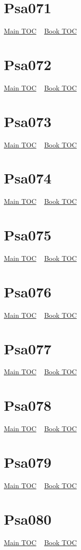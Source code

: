 \documentclass{book}
\begin{document}
  \section{Psa071}\hyperlink{toc}{Main TOC} ~ \hyperref[subsec:Psa]{Book TOC} 
  \section{Psa072}\hyperlink{toc}{Main TOC} ~ \hyperref[subsec:Psa]{Book TOC} 
  \section{Psa073}\hyperlink{toc}{Main TOC} ~ \hyperref[subsec:Psa]{Book TOC} 
  \section{Psa074}\hyperlink{toc}{Main TOC} ~ \hyperref[subsec:Psa]{Book TOC} 
  \section{Psa075}\hyperlink{toc}{Main TOC} ~ \hyperref[subsec:Psa]{Book TOC} 
  \section{Psa076}\hyperlink{toc}{Main TOC} ~ \hyperref[subsec:Psa]{Book TOC} 
  \section{Psa077}\hyperlink{toc}{Main TOC} ~ \hyperref[subsec:Psa]{Book TOC} 
  \section{Psa078}\hyperlink{toc}{Main TOC} ~ \hyperref[subsec:Psa]{Book TOC} 
  \section{Psa079}\hyperlink{toc}{Main TOC} ~ \hyperref[subsec:Psa]{Book TOC} 
  \section{Psa080}\hyperlink{toc}{Main TOC} ~ \hyperref[subsec:Psa]{Book TOC} 
\end{document}
